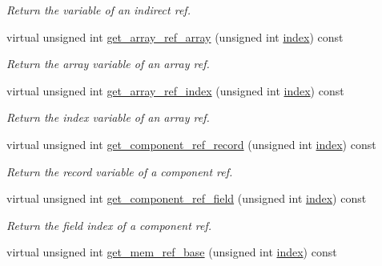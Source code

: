 \begin{DoxyCompactItemize}
\begin{DoxyCompactList}\small\item\em Return the variable of an indirect ref. \end{DoxyCompactList}\item 
virtual unsigned int \hyperlink{classBehavioralHelper_ae23d240480b0859b3bae1e63968a35d7}{get\+\_\+array\+\_\+ref\+\_\+array} (unsigned int \hyperlink{tutorial__pact__2019_2Introduction_2third_2include_2Keccak_8h_a028c9bdc8344cca38ab522a337074797}{index}) const
\begin{DoxyCompactList}\small\item\em Return the array variable of an array ref. \end{DoxyCompactList}\item 
virtual unsigned int \hyperlink{classBehavioralHelper_ae4927e97c38dcd00e2afabfd90290d3b}{get\+\_\+array\+\_\+ref\+\_\+index} (unsigned int \hyperlink{tutorial__pact__2019_2Introduction_2third_2include_2Keccak_8h_a028c9bdc8344cca38ab522a337074797}{index}) const
\begin{DoxyCompactList}\small\item\em Return the index variable of an array ref. \end{DoxyCompactList}\item 
virtual unsigned int \hyperlink{classBehavioralHelper_ab21921c77ebb4ed124d6059ad69cb523}{get\+\_\+component\+\_\+ref\+\_\+record} (unsigned int \hyperlink{tutorial__pact__2019_2Introduction_2third_2include_2Keccak_8h_a028c9bdc8344cca38ab522a337074797}{index}) const
\begin{DoxyCompactList}\small\item\em Return the record variable of a component ref. \end{DoxyCompactList}\item 
virtual unsigned int \hyperlink{classBehavioralHelper_a434d3ef93a1ec7bb1e3d104aa6a936d4}{get\+\_\+component\+\_\+ref\+\_\+field} (unsigned int \hyperlink{tutorial__pact__2019_2Introduction_2third_2include_2Keccak_8h_a028c9bdc8344cca38ab522a337074797}{index}) const
\begin{DoxyCompactList}\small\item\em Return the field index of a component ref. \end{DoxyCompactList}\item 
virtual unsigned int \hyperlink{classBehavioralHelper_a2df88b4bc5b3891c8aa7b7a5109ca64f}{get\+\_\+mem\+\_\+ref\+\_\+base} (unsigned int \hyperlink{tutorial__pact__2019_2Introduction_2third_2include_2Keccak_8h_a028c9bdc8344cca38ab522a337074797}{index}) const

\end{DoxyCompactItemize}
